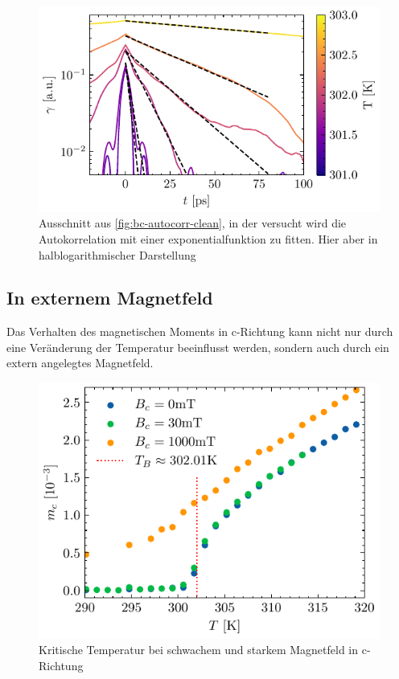 \documentclass[main.tex]{subfiles}
\begin{document}

\begin{figure}[H]
    \centering
    \includegraphics{bilder/plots/temp_comparison/autocorrelation_cleaned_log.pdf}
    \caption{Ausschnitt aus \cref{fig:bc-autocorr-clean}, in der versucht wird die Autokorrelation mit einer exponentialfunktion zu fitten. Hier aber in halblogarithmischer Darstellung}\label{fig:temp-autocorr-fit}
\end{figure}

\subsection{In externem Magnetfeld}

Das Verhalten des magnetischen Moments in c-Richtung kann nicht nur durch eine Veränderung der Temperatur beeinflusst werden, sondern auch durch ein extern angelegtes Magnetfeld.

\begin{figure}[H]
    \centering
    \includegraphics{bilder/plots/Bz_comparison/critical_temperature.pdf}
    \caption{Kritische Temperatur bei schwachem und starkem Magnetfeld in c-Richtung }\label{fig:bc-crit-temp}
\end{figure}
\end{document}
